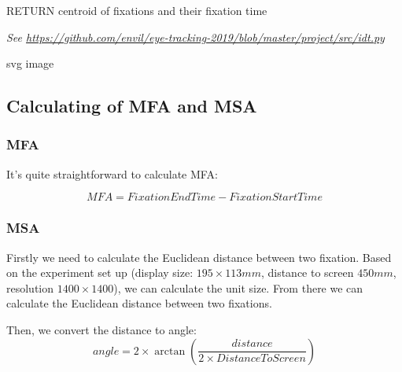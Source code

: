 \documentclass[sigchi-a]{acmart}
\begin{document}
RETURN centroid of fixations and their fixation time


\textit{See \url{https://github.com/envil/eye-tracking-2019/blob/master/project/src/idt.py}}   

\begin{marginfigure}
  \centering
  
  \caption{svg image}
\end{marginfigure}

\subsection{Calculating of MFA and MSA}
\subsubsection{MFA}
It's quite straightforward to calculate MFA:

\begin{equation}
    MFA = FixationEndTime - FixationStartTime
\end{equation} 
\subsubsection{MSA} Firstly we need to calculate the Euclidean distance between two fixation. Based on the experiment set up (display size: $195\times113mm$, distance to screen $450mm$, resolution $1400\times1400$), we can calculate the unit size. From there we can calculate the Euclidean distance between two fixations.

Then, we convert the distance to angle:
\begin{equation}
    angle=2\times \arctan\left(\frac{distance}{2\times DistanceToScreen}\right)
\end{equation}


\end{document}
